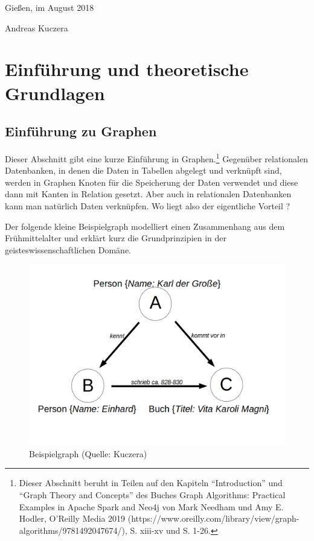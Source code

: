 Gießen, im August 2018

Andreas Kuczera

\hypertarget{einfuxfchrung-und-theoretische-grundlagen}{%
\section{Einführung und theoretische
Grundlagen}\label{einfuxfchrung-und-theoretische-grundlagen}}

\hypertarget{einfuxfchrung-zu-graphen}{%
\subsection{Einführung zu Graphen}\label{einfuxfchrung-zu-graphen}}

Dieser Abschnitt gibt eine kurze Einführung in Graphen.\footnote{Dieser
  Abschnitt beruht in Teilen auf den Kapiteln ``Introduction'' und
  ``Graph Theory and Concepts'' des Buches Graph Algorithms: Practical
  Examples in Apache Spark and Neo4j von Mark Needham und Amy E. Hodler,
  O'Reilly Media 2019
  (https://www.oreilly.com/library/view/graph-algorithms/9781492047674/),
  S. xiii-xv und S. 1-26.} Gegenüber relationalen Datenbanken, in denen
die Daten in Tabellen abgelegt und verknüpft sind, werden in Graphen
Knoten für die Speicherung der Daten verwendet und diese dann mit Kanten
in Relation gesetzt. Aber auch in relationalen Datenbanken kann man
natürlich Daten verknüpfen. Wo liegt also der eigentliche Vorteil ?

Der folgende kleine Beispielgraph modelliert einen Zusammenhang aus dem
Frühmittelalter und erklärt kurz die Grundprinzipien in der
geisteswissenschaftlichen Domäne.

\begin{figure}
\centering
\includegraphics{Bilder/Beispielgraph.png}
\caption{Beispielgraph (Quelle: Kuczera)}
\end{figure}


